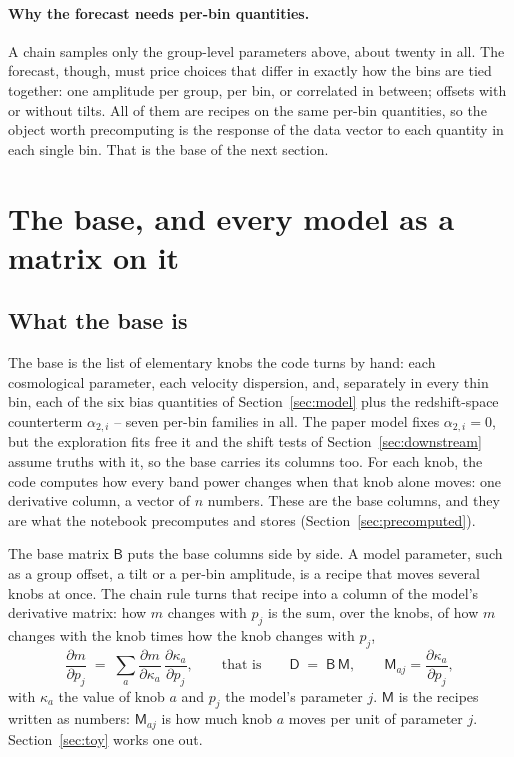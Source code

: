 \documentclass[11pt]{article}
\newcommand{\mB}{\mathsf{B}}
\newcommand{\mM}{\mathsf{M}}
\newcommand{\mD}{\mathsf{D}}
\begin{document}
\paragraph{Why the forecast needs per-bin quantities.}
A chain samples only the group-level parameters above, about twenty in
all.  The forecast, though, must price choices that differ in exactly
how the bins are tied together: one amplitude per group, per bin, or
correlated in between; offsets with or without tilts.  All of them are
recipes on the same per-bin quantities, so the object worth
precomputing is the response of the data vector to each quantity in
each single bin.  That is the base of the next section.

\section{The base, and every model as a matrix on it}
\label{sec:base}

\subsection{What the base is}
\label{sec:whatbase}

The base is the list of elementary knobs the code turns by hand: each
cosmological parameter, each velocity dispersion, and, separately in
every thin bin, each of the six bias quantities of
Section~\ref{sec:model} plus the redshift-space counterterm
$\alpha_{2,i}$ -- seven per-bin families in all.  The paper model
fixes $\alpha_{2,i} = 0$, but the exploration fits free it and the shift tests of
Section~\ref{sec:downstream} assume truths with it, so the base
carries its columns too.  For each knob, the code computes how every
band power changes when that
knob alone moves: one derivative column, a vector of $n$ numbers.  These
are the base columns, and they are what the notebook precomputes and
stores (Section~\ref{sec:precomputed}).

The base matrix $\mB$ puts the base columns side by side.  A model
parameter, such as a group offset, a tilt or a per-bin amplitude, is a
recipe that moves several knobs at once.  The chain rule turns that
recipe into a column of the model's derivative matrix: how $m$ changes
with $p_j$ is the sum, over the knobs, of how $m$ changes with the knob
times how the knob changes with $p_j$,
\begin{equation}
  \frac{\partial m}{\partial p_j}
  \;=\; \sum_a \frac{\partial m}{\partial \kappa_a}\,
    \frac{\partial \kappa_a}{\partial p_j} ,
  \qquad\text{that is}\qquad
  \mD \;=\; \mB\,\mM ,
  \qquad
  \mM_{aj} = \frac{\partial \kappa_a}{\partial p_j} ,
  \label{eq:dbm}
\end{equation}
with $\kappa_a$ the value of knob $a$ and $p_j$ the model's parameter
$j$.  $\mM$ is the recipes written as numbers: $\mM_{aj}$ is how much
knob $a$ moves per unit of parameter $j$.  Section~\ref{sec:toy} works
one out.
\end{document}
